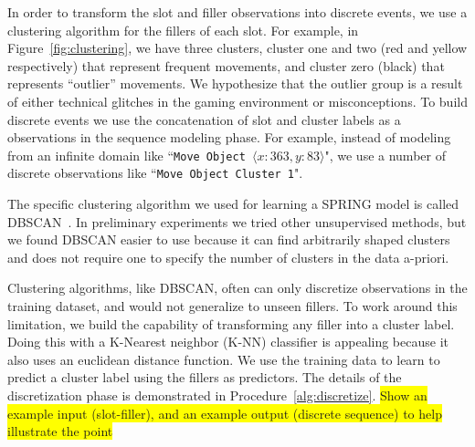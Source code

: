 \documentclass{sigchi}
\newcommand{\hl}[1]{\colorbox{yellow}{#1}}
\begin{document}
In order to transform the slot and filler observations into discrete events, we use a clustering algorithm for the fillers of each slot.
For example, in Figure~\ref{fig:clustering},%
we have three clusters,  cluster one and two (red and yellow respectively) that represent frequent movements, and cluster zero (black) that represents ``outlier'' movements.
We hypothesize that the outlier group is a result of either technical glitches in the gaming environment or misconceptions.
To build discrete events we use the  concatenation of slot and cluster labels as a  observations in the sequence modeling phase.
For example, instead of modeling from an infinite  domain like ``\texttt{Move Object $\langle x:363, y:83 \rangle$}",
we use a number of discrete observations like ``\texttt{Move Object Cluster 1}".

The specific clustering algorithm we used  for learning a SPRING model is  called DBSCAN~\cite{ester1996density}.
In preliminary experiments we tried other  unsupervised methods, but  we found DBSCAN easier to use because it can find arbitrarily shaped clusters and does not require one to specify the number of clusters in the data a-priori.


Clustering algorithms, like DBSCAN, often can only discretize observations in the training dataset, and would not generalize to unseen fillers.
To work around this limitation, we build the capability of transforming any  filler into a cluster label. 
Doing this with a K-Nearest neighbor (K-NN) classifier is appealing because it also uses an euclidean distance function.
We use the training data to learn to predict a cluster label using the fillers as predictors.
The details of the discretization phase is demonstrated in Procedure~\ref{alg:discretize}.
\hl{Show an example input (slot-filler), and an example output (discrete sequence) to help illustrate the point}
\end{document}
